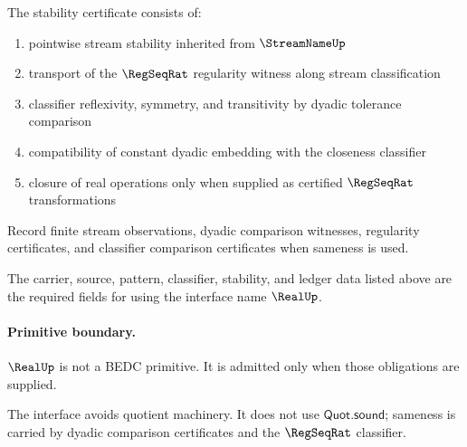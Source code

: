 \begin{definition}
\label{def:real-stability-certificate}
The stability certificate consists of:
\begin{enumerate}
  \item pointwise stream stability inherited from $\StreamNameUp$
  \item transport of the $\RegSeqRat$ regularity witness along stream classification
  \item classifier reflexivity, symmetry, and transitivity by dyadic tolerance comparison
  \item compatibility of constant dyadic embedding with the closeness classifier
  \item closure of real operations only when supplied as certified $\RegSeqRat$ transformations
\end{enumerate}
\end{definition}

\begin{definition}
\label{def:real-ledger-policy}
Record finite stream observations, dyadic comparison witnesses, regularity certificates, and classifier comparison certificates when sameness is used.
\end{definition}

\begin{definition}
\label{def:real-certificate-obligations}
The carrier, source, pattern, classifier, stability, and ledger data listed above are the required fields for using the interface name $\RealUp$.
\end{definition}

\paragraph{Primitive boundary.}
$\RealUp$ is not a BEDC primitive. It is admitted only when those obligations are supplied.

\begin{remark}
\label{rem:real-zero-axiom-note}
The interface avoids quotient machinery. It does not use $\mathsf{Quot.sound}$; sameness is carried by dyadic comparison certificates and the $\RegSeqRat$ classifier.
\end{remark}
